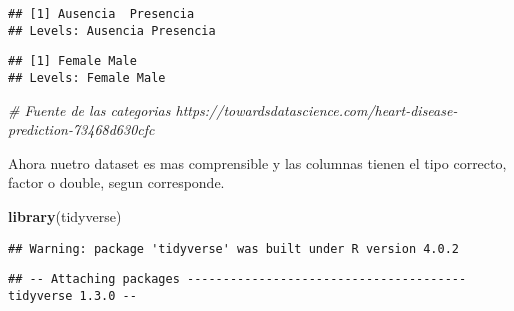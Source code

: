 \documentclass[
]{article}
\newenvironment{Shaded}{\begin{snugshade}}{\end{snugshade}}
\newcommand{\CommentTok}[1]{\textcolor[rgb]{0.56,0.35,0.01}{\textit{#1}}}
\newcommand{\KeywordTok}[1]{\textcolor[rgb]{0.13,0.29,0.53}{\textbf{#1}}}
\newcommand{\NormalTok}[1]{#1}
\newcommand{\OperatorTok}[1]{\textcolor[rgb]{0.81,0.36,0.00}{\textbf{#1}}}
\newcommand{\StringTok}[1]{\textcolor[rgb]{0.31,0.60,0.02}{#1}}
\begin{document}
\begin{verbatim}
## [1] Ausencia  Presencia
## Levels: Ausencia Presencia
\end{verbatim}

\begin{Shaded}
\end{Shaded}

\begin{verbatim}
## [1] Female Male  
## Levels: Female Male
\end{verbatim}

\begin{Shaded}
\begin{Highlighting}[]
\CommentTok{# Fuente de las categorias https://towardsdatascience.com/heart-disease-prediction-73468d630cfc}
\end{Highlighting}
\end{Shaded}

Ahora nuetro dataset es mas comprensible y las columnas tienen el tipo
correcto, factor o double, segun corresponde.

\begin{Shaded}
\begin{Highlighting}[]
\KeywordTok{library}\NormalTok{(tidyverse) }
\end{Highlighting}
\end{Shaded}

\begin{verbatim}
## Warning: package 'tidyverse' was built under R version 4.0.2
\end{verbatim}

\begin{verbatim}
## -- Attaching packages --------------------------------------- tidyverse 1.3.0 --
\end{verbatim}
\end{document}
